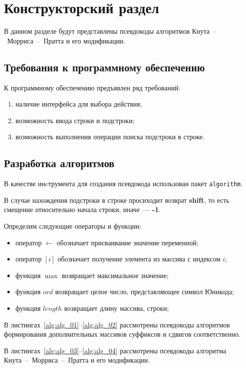 \chapter{Конструкторский раздел}
В данном разделе будут представлены псевдокоды алгоритмов Кнута~--~Морриса~--~Пратта и его модификации.

\section{Требования к программному обеспечению}
К программному обеспечению предъявлен ряд требований:
\begin{enumerate}
	\item наличие интерфейса для выбора действия;
	\item возможность ввода строки и подстроки;
	\item возможность выполнения операции поиска подстроки в строке.
\end{enumerate}

\section{Разработка алгоритмов}
В качестве инcтрумента для создания псевдокода использован пакет \texttt{algorithm}.

В случае нахождения подстроки в строке просиходит возврат \textbf{shift}, то есть смещение относительно начала строки, иначе~--- \textbf{-1}. 

Определим следующие операторы и функции:
\begin{itemize}
	\item оператор $\gets$ обозначает присваивание значение переменной;
	\item оператор $[i]$ обозначает получение элемента из массива с индексом $i$;
	\item функция $\max$ возвращает максимальное значение;
	\item функция $ord$ возвращает целое число, представляющее символ Юникода;
	\item функция $length$ возвращает длину массива, строки;
\end{itemize}

В листингах~\ref{alg:alg_01}--\ref{alg:alg_02} рассмотрены псевдокоды алгоритмов формирования дополнительных массивов суффиксов и сдвигов соответственно. 

В листингах~\ref{alg:alg_03}--\ref{alg:alg_04} рассмотрены псевдокоды алгоритма Кнута~--~Морриса~--~Пратта и его модификации. 


